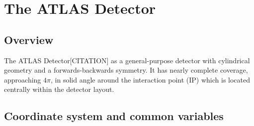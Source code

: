 \section{The ATLAS Detector}
\subsection{Overview}
The ATLAS Detector[CITATION] as a general-purpose detector with cylindrical geometry and a forwards-backwards symmetry. It has nearly complete coverage, approaching $4\pi$, in solid angle around the interaction point (IP) which is located centrally within the detector layout.


\subsection{Coordinate system and common variables}

